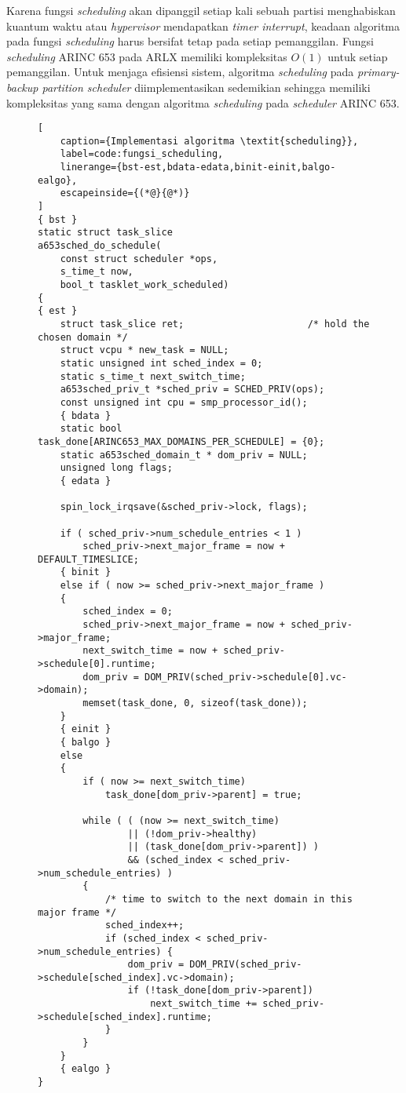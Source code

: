 Karena fungsi \textit{scheduling} akan dipanggil setiap kali sebuah partisi menghabiskan kuantum
waktu atau \textit{hypervisor} mendapatkan \textit{timer interrupt}, keadaan algoritma pada
fungsi \textit{scheduling} harus bersifat tetap pada setiap pemanggilan. Fungsi
\textit{scheduling} ARINC 653 pada ARLX memiliki kompleksitas $O(1)$ untuk setiap pemanggilan.
Untuk menjaga efisiensi sistem, algoritma \textit{scheduling} pada \textit{primary-backup
partition scheduler} diimplementasikan sedemikian sehingga memiliki kompleksitas yang sama
dengan algoritma \textit{scheduling} pada \textit{scheduler} ARINC 653.

\begin{figure}
\begin{lstlisting}[
	caption={Implementasi algoritma \textit{scheduling}},
	label=code:fungsi_scheduling,
	linerange={bst-est,bdata-edata,binit-einit,balgo-ealgo},
	escapeinside={(*@}{@*)}
]
{ bst }
static struct task_slice
a653sched_do_schedule(
    const struct scheduler *ops,
    s_time_t now,
    bool_t tasklet_work_scheduled)
{
{ est }
    struct task_slice ret;                      /* hold the chosen domain */
    struct vcpu * new_task = NULL;
    static unsigned int sched_index = 0;
    static s_time_t next_switch_time;
    a653sched_priv_t *sched_priv = SCHED_PRIV(ops);
    const unsigned int cpu = smp_processor_id();
    { bdata }
    static bool task_done[ARINC653_MAX_DOMAINS_PER_SCHEDULE] = {0};
    static a653sched_domain_t * dom_priv = NULL;
    unsigned long flags;
    { edata }

    spin_lock_irqsave(&sched_priv->lock, flags);

    if ( sched_priv->num_schedule_entries < 1 )
        sched_priv->next_major_frame = now + DEFAULT_TIMESLICE;
    { binit }
    else if ( now >= sched_priv->next_major_frame )
    {
        sched_index = 0;
        sched_priv->next_major_frame = now + sched_priv->major_frame;
        next_switch_time = now + sched_priv->schedule[0].runtime;
        dom_priv = DOM_PRIV(sched_priv->schedule[0].vc->domain);
        memset(task_done, 0, sizeof(task_done));
    }
    { einit }
    { balgo }
    else
    {
        if ( now >= next_switch_time) 
            task_done[dom_priv->parent] = true;

        while ( ( (now >= next_switch_time)
                || (!dom_priv->healthy)
                || (task_done[dom_priv->parent]) )
                && (sched_index < sched_priv->num_schedule_entries) )
        {
            /* time to switch to the next domain in this major frame */
            sched_index++;
            if (sched_index < sched_priv->num_schedule_entries) {
                dom_priv = DOM_PRIV(sched_priv->schedule[sched_index].vc->domain);
                if (!task_done[dom_priv->parent])
                    next_switch_time += sched_priv->schedule[sched_index].runtime;
            }
        }
    }
    { ealgo }
}
\end{lstlisting}
\end{figure}

